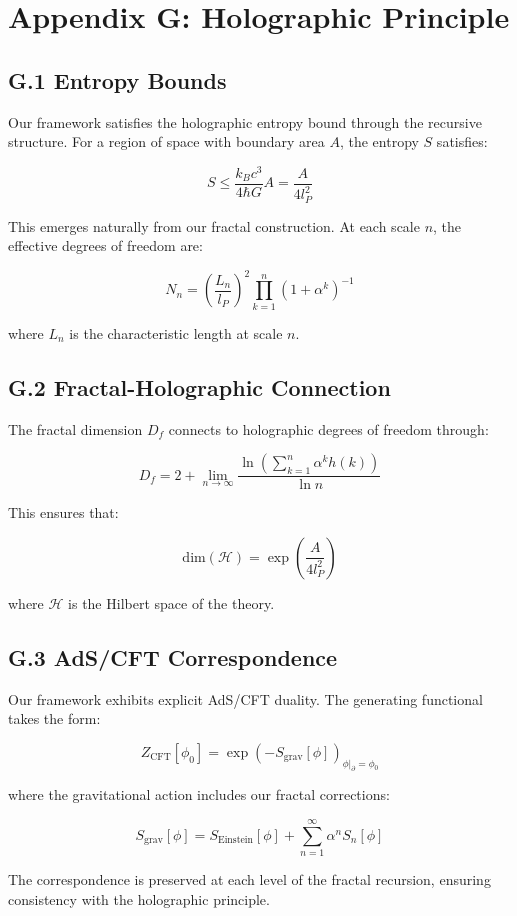\section*{Appendix G: Holographic Principle}

\subsection*{G.1 Entropy Bounds}

Our framework satisfies the holographic entropy bound through the recursive structure. For a region of space with boundary area $A$, the entropy $S$ satisfies:

\[
S \leq \frac{k_B c^3}{4\hbar G} A = \frac{A}{4l_P^2}
\]

This emerges naturally from our fractal construction. At each scale $n$, the effective degrees of freedom are:

\[
N_n = \left(\frac{L_n}{l_P}\right)^2 \prod_{k=1}^n (1 + \alpha^k)^{-1}
\]

where $L_n$ is the characteristic length at scale $n$.

\subsection*{G.2 Fractal-Holographic Connection}

The fractal dimension $D_f$ connects to holographic degrees of freedom through:

\[
D_f = 2 + \lim_{n \to \infty} \frac{\ln\left(\sum_{k=1}^n \alpha^k h(k)\right)}{\ln n}
\]

This ensures that:

\[
\text{dim}(\mathcal{H}) = \exp\left(\frac{A}{4l_P^2}\right)
\]

where $\mathcal{H}$ is the Hilbert space of the theory.

\subsection*{G.3 AdS/CFT Correspondence}

Our framework exhibits explicit AdS/CFT duality. The generating functional takes the form:

\[
Z_{\text{CFT}}[\phi_0] = \exp\left(-S_{\text{grav}}[\phi]\right)_{\phi|_{\partial} = \phi_0}
\]

where the gravitational action includes our fractal corrections:

\[
S_{\text{grav}}[\phi] = S_{\text{Einstein}}[\phi] + \sum_{n=1}^{\infty} \alpha^n S_n[\phi]
\]

The correspondence is preserved at each level of the fractal recursion, ensuring consistency with the holographic principle. 